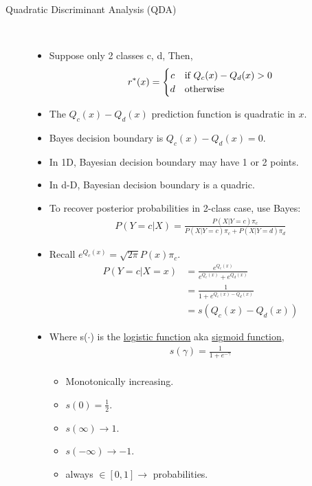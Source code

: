 \documentclass[10pt]{article}
\begin{document}
\begin{description}
	\item[Quadratic Discriminant Analysis (QDA)]
		\
		\begin{itemize}
			\item Suppose only 2 classes c, d, Then,
				\[
 				r^{*}(x) = \left\{\def\arraystretch{1.2}%
 					\begin{array}{@{}c@{\quad}l@{}}
    					c & \text{if $Q_{c}(x) - Q_{d}(x) > 0$}\\
   						d & \text{otherwise}\\
					\end{array}\right.
				\]
			\item The $Q_{c}(x) - Q_{d}(x)$ prediction function is quadratic in $x$.
			\item Bayes decision boundary is $Q_{c}(x) - Q_{d}(x) = 0$.
			\item In 1D, Bayesian decision boundary may have 1 or 2 points.
			\item In d-D, Bayesian decision boundary is a quadric. 
			\item To recover posterior probabilities in 2-class case, use Bayes:
				\begin{align*}
					P(Y=c|X) = \frac{P(X|Y=c)\pi_{c}}{P(X|Y=c)\pi_{c} + P(X|Y=d)\pi_{d}}
				\end{align*}
			\item Recall $e^{Q_{c}(x)} = \sqrt{2\pi}P(x)\pi_{c}$.
				\begin{align*}
					P(Y=c|X=x) &= \frac{e^{Q_{c}(x)}}{e^{Q_{c}(x)} + e^{Q_{d}(x)}}\\
					&= \frac{1}{1 + e^{Q_{c}(x) - Q_{d}(x)}}\\
					&= s(Q_{c}(x) - Q_{d}(x))
				\end{align*}
			\item Where s($\cdot$) is the \underline{logistic function} aka \underline{sigmoid function}, 
				\begin{align*}
					s(\gamma) = \frac{1}{1 + e^{-\gamma}}\\
				\end{align*}
				\begin{itemize}
					\item Monotonically increasing.\\
					\item $s(0) = \frac{1}{2}$.\\
					\item $s(\infty) \rightarrow 1$.\\
					\item $s(-\infty) \rightarrow -1$.\\
					\item always $\in [0, 1] \rightarrow$ probabilities.
				\end{itemize}
		\end{itemize}
		

\end{description}
\end{document}
